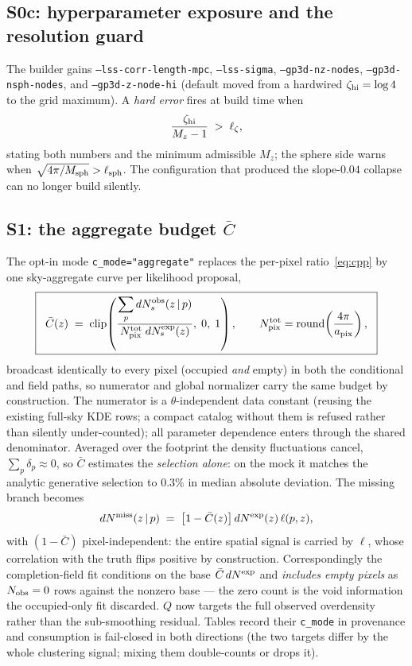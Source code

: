 \documentclass[11pt]{article}
\newcommand{\dNobs}{dN^{\rm obs}_{s}}
\newcommand{\dNexp}{dN^{\rm exp}}
\newcommand{\dNexps}{dN^{\rm exp}_{s}}
\newcommand{\dNmiss}{dN^{\rm miss}}
\newcommand{\Cbar}{\bar{C}}
\begin{document}
\subsection{S0c: hyperparameter exposure and the resolution guard}

The builder gains \texttt{--lss-corr-length-mpc}, \texttt{--lss-sigma},
\texttt{--gp3d-nz-nodes}, \texttt{--gp3d-nsph-nodes}, and \texttt{--gp3d-z-node-hi}
(default moved from a hardwired $\zeta_{\rm hi} = \log 4$ to the grid maximum). A
\emph{hard error} fires at build time when
\begin{equation}
\frac{\zeta_{\rm hi}}{M_z - 1} \;>\; \ell_\zeta ,
\end{equation}
stating both numbers and the minimum admissible $M_z$; the sphere side warns when
$\sqrt{4\pi/M_{\rm sph}} > \ell_{\rm sph}$. The configuration that produced the
slope-$0.04$ collapse can no longer build silently.

\subsection{S1: the aggregate budget $\Cbar$}

The opt-in mode \texttt{c\_mode="aggregate"} replaces the per-pixel
ratio~\eqref{eq:cpp} by one sky-aggregate curve per likelihood proposal,
\begin{equation}
\boxed{\;\;
\Cbar(z) \;=\;
\mathrm{clip}\!\left(
\frac{\displaystyle \sum_{p} \dNobs(z\,|\,p)}
{\,N_{\rm pix}^{\rm tot}\; \dNexps(z)\,},\; 0,\; 1\right),
\qquad
N_{\rm pix}^{\rm tot} = \mathrm{round}\!\left(\frac{4\pi}{a_{\rm pix}}\right),
\;\;}
\label{eq:cbar}
\end{equation}
broadcast identically to every pixel (occupied \emph{and} empty) in both the
conditional and field paths, so numerator and global normalizer carry the same
budget by construction. The numerator is a $\theta$-independent data constant
(reusing the existing full-sky KDE rows; a compact catalog without them is refused
rather than silently under-counted); all parameter dependence enters through the
shared denominator. Averaged over the footprint the density fluctuations cancel,
$\sum_p \delta_p \approx 0$, so $\Cbar$ estimates the \emph{selection alone}: on the
mock it matches the analytic generative selection to $0.3\%$ in median absolute
deviation. The missing branch becomes
\begin{equation}
\dNmiss(z\,|\,p) \;=\; \bigl[1 - \Cbar(z)\bigr]\, \dNexp(z)\, \ell(p, z),
\end{equation}
with $(1-\Cbar)$ pixel-independent: the entire spatial signal is carried by $\ell$,
whose correlation with the truth flips positive by construction. Correspondingly the
completion-field fit conditions on the base $\Cbar\,\dNexp$ and \emph{includes empty
pixels} as $N_{\rm obs} = 0$ rows against the nonzero base --- the zero count is the
void information the occupied-only fit discarded. $Q$ now targets the full observed
overdensity rather than the sub-smoothing residual. Tables record their
\texttt{c\_mode} in provenance and consumption is fail-closed in both directions
(the two targets differ by the whole clustering signal; mixing them double-counts or
drops it).
\end{document}

